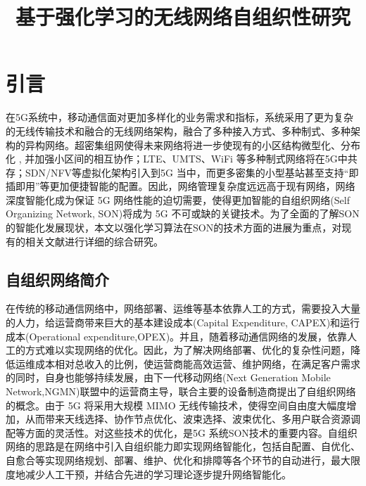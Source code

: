 \documentclass{IEEEtran}
\begin{document}
\title{基于强化学习的无线网络自组织性研究}
\maketitle

%

\section{引言}
在5G系统中，移动通信面对更加多样化的业务需求和指标，系统采用了更为复杂的无线传输技术和融合的无线网络架构，融合了多种接入方式、多种制式、多种架构的异构网络。超密集组网使得未来网络将进一步使现有的小区结构微型化、分布化 , 并加强小区间的相互协作；LTE、UMTS、WiFi 等多种制式网络将在5G中共存；SDN/NFV等虚拟化架构引入到5G 当中，而更多密集的小型基站甚至支持“即插即用”等更加便捷智能的配置。因此，网络管理复杂度远远高于现有网络，网络深度智能化成为保证 5G 网络性能的迫切需要，使得更加智能的自组织网络(Self Organizing Network, SON)将成为 5G 不可或缺的关键技术。为了全面的了解SON的智能化发展现状，本文以强化学习算法在SON的技术方面的进展为重点，对现有的相关文献进行详细的综合研究。

\subsection{自组织网络简介}


在传统的移动通信网络中，网络部署、运维等基本依靠人工的方式，需要投入大量的人力，给运营商带来巨大的基本建设成本(Capital Expenditure, CAPEX)和运行成本(Operational expenditure,OPEX)。并且，随着移动通信网络的发展，依靠人工的方式难以实现网络的优化。因此，为了解决网络部署、优化的复杂性问题，降低运维成本相对总收入的比例，使运营商能高效运营、维护网络，在满足客户需求的同时，自身也能够持续发展，由下一代移动网络(Next Generation Mobile Network,NGMN)联盟中的运营商主导，联合主要的设备制造商提出了自组织网络的概念\cite{Alliance2008}。由于 5G 将采用大规模 MIMO 无线传输技术，使得空间自由度大幅度增加，从而带来天线选择、协作节点优化、波束选择、波束优化、多用户联合资源调配等方面的灵活性。对这些技术的优化，是5G 系统SON技术的重要内容。自组织网络的思路是在网络中引入自组织能力即实现网络智能化，包括自配置、自优化、自愈合等实现网络规划、部署、维护、优化和排障等各个环节的自动进行，最大限度地减少人工干预，并结合先进的学习理论逐步提升网络智能化。
\end{document}
